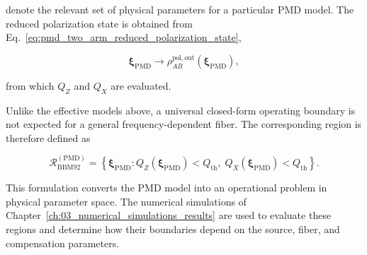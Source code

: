 denote the relevant set of physical parameters for a particular PMD model. The
reduced polarization state is obtained from
Eq.~\eqref{eq:pmd_two_arm_reduced_polarization_state},

\begin{equation}
\boldsymbol{\xi}_{\mathrm{PMD}}
\longrightarrow
\rho_{AB}^{\mathrm{pol,out}}
\left(
\boldsymbol{\xi}_{\mathrm{PMD}}
\right),
\label{eq:pmd_parameter_to_state_mapping}
\end{equation}

from which \(Q_Z\) and \(Q_X\) are evaluated.

Unlike the effective models above, a universal closed-form operating boundary is
not expected for a general frequency-dependent fiber. The corresponding region is
therefore defined as

\begin{equation}
\boxed{
\mathcal{R}_{\mathrm{BBM92}}^{(\mathrm{PMD})}
=
\left\{
\boldsymbol{\xi}_{\mathrm{PMD}}:
Q_Z(\boldsymbol{\xi}_{\mathrm{PMD}})<Q_{\mathrm{th}},
\;
Q_X(\boldsymbol{\xi}_{\mathrm{PMD}})<Q_{\mathrm{th}}
\right\}.
}
\label{eq:bbm92_region_pmd}
\end{equation}

This formulation converts the PMD model into an operational problem in physical
parameter space. The numerical simulations of
Chapter~\ref{ch:03_numerical_simulations_results} are used to evaluate these
regions and determine how their boundaries depend on the source, fiber, and
compensation parameters.


